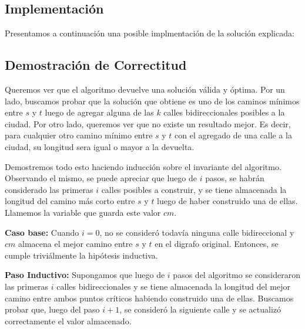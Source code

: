 \subsection{Implementación}
\vspace{1em}

Presentamos a continuación una posible implmentación de la solución explicada:



\subsection{Demostración de Correctitud}
\vspace{1em}

Queremos ver que el algoritmo devuelve una solución válida y óptima. Por un lado, buscamos probar que la solución que obtiene es uno de los caminos mínimos entre $s$ y $t$ luego de agregar alguna de las $k$ calles bidireccionales posibles a la ciudad. Por otro lado, queremos ver que no existe un resultado mejor. Es decir, para cualquier otro camino mínimo entre $s$ y $t$ con el agregado de una calle a la ciudad, su longitud sera igual o mayor a la devuelta.

\vspace{1em}

Demostremos todo esto haciendo inducción sobre el invariante del algoritmo. Observando el mismo, se puede apreciar que luego de $i$ pasos, se habrán considerado las primeras $i$ calles posibles a construir, y se tiene almacenada la longitud del camino más corto entre $s$ y $t$ luego de haber construido una de ellas. Llamemos la variable que guarda este valor $cm$. 

\vspace{1em}

\textbf{Caso base:} Cuando $i = 0$, no se consideró todavía ninguna calle bidireccional y $cm$ almacena el mejor camino entre $s$ y $t$ en el digrafo original. Entonces, se cumple triviálmente la hipótesis inductiva.

\vspace{1em}

\textbf{Paso Inductivo:} Supongamos que luego de $i$ pasos del algoritmo se consideraron las primeras $i$ calles bidireccionales y se tiene almacenada la longitud del mejor camino entre ambos puntos críticos habiendo construido una de ellas. Buscamos probar que, luego del paso $i+1$, se consideró la siguiente calle y se actualizó correctamente el valor almacenado.

